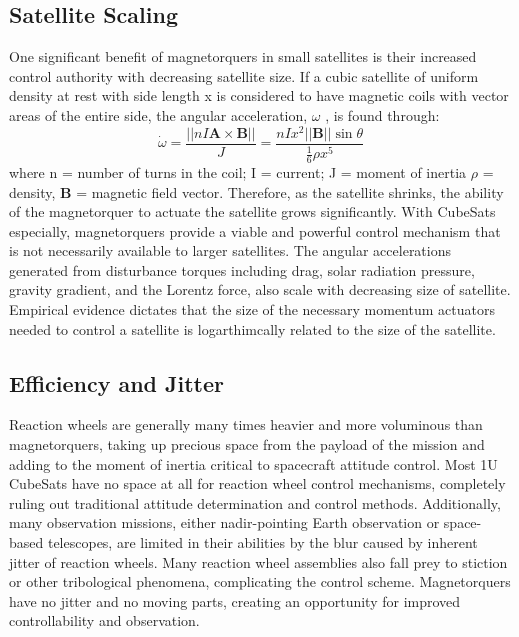 \documentclass[letterpaper, preprint, paper,11pt]{IAA-AAS}	%
\begin{document}
\subsection{Satellite Scaling}
One significant benefit of magnetorquers in small satellites is their increased control authority with decreasing satellite size. If a cubic satellite of uniform density at rest with side length x is considered to have magnetic coils with vector areas of the entire side, the angular acceleration, $\omega$ , is found through:
\begin{equation}
	\label{eq:2}
	\dot{\omega} = \frac{||nI\textbf{A}\times\textbf{B}||}{J} = \frac{nIx^2||\textbf{B}||\sin\theta}{\frac{1}{6}\rho x^5}
\end{equation}
where n = number of turns in the coil; I = current; J = moment of inertia  $\rho$ = density, $\textbf{B}$ = magnetic field vector. Therefore, as the satellite shrinks, the ability of the magnetorquer to actuate the satellite grows significantly. With CubeSats especially, magnetorquers provide a viable and powerful control mechanism that is not necessarily available to larger satellites. The angular accelerations generated from disturbance torques including drag, solar radiation pressure, gravity gradient, and the Lorentz force, also scale with decreasing size of satellite. Empirical evidence dictates that the size of the necessary momentum actuators needed to control a satellite is logarthimcally related to the size of the satellite\cite{streeman2017}.

\subsection{Efficiency and Jitter}
Reaction wheels are generally many times heavier and more voluminous than magnetorquers, taking up precious space from the payload of the mission and adding to the moment of inertia critical to spacecraft attitude control. Most 1U CubeSats have no space at all for reaction wheel control mechanisms, completely ruling out traditional attitude determination and control methods. Additionally, many observation missions, either nadir-pointing Earth observation or space-based telescopes, are limited in their abilities by the blur caused by inherent jitter of reaction wheels. Many reaction wheel assemblies also fall prey to stiction or other tribological phenomena, complicating the control scheme. Magnetorquers have no jitter and no moving parts, creating an opportunity for improved controllability and observation. 
\end{document}

